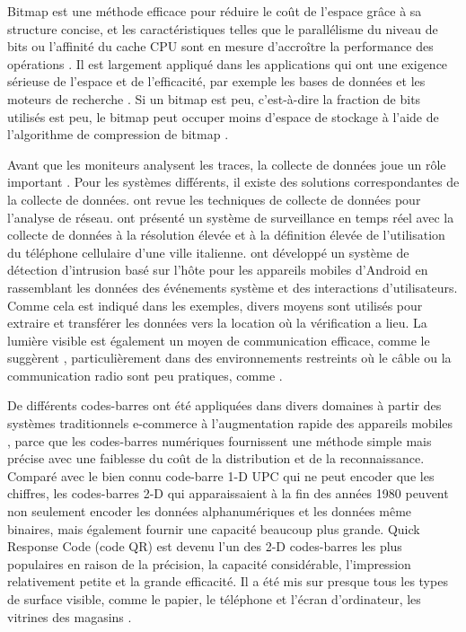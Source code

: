 Bitmap est une méthode efficace pour réduire le coût de l'espace grâce à sa structure concise, et les caractéristiques telles que le parallélisme du niveau de bits ou l'affinité du cache CPU sont en mesure d'accroître la performance des opérations \citep{culpepper2010efficient}. Il est largement appliqué dans les applications qui ont une exigence sérieuse de l'espace et de l'efficacité, par exemple les bases de données et les moteurs de recherche \citep{lemire2014}. Si un bitmap est peu, c'est-à-dire la fraction de bits utilisés est peu, le bitmap peut occuper moins d'espace de stockage à l'aide de l'algorithme de compression de bitmap \citep{antoshenkov1995byte}.

Avant que les moniteurs analysent les traces, la collecte de données joue un rôle important \citep{casley1988collection}. Pour les systèmes différents, il existe des solutions correspondantes de la collecte de données. \cite{zwijze2005auditing} ont revue les techniques de collecte de données pour l'analyse de réseau. \cite{calabrese2011real} ont présenté un système de surveillance en temps réel avec la collecte de données à la résolution élevée et à la définition élevée de l'utilisation du téléphone cellulaire d'une ville italienne. \cite{shabtai2010applying} ont développé un système de détection d'intrusion basé sur l'hôte pour les appareils mobiles d'Android en rassemblant les données des événements système et des interactions d'utilisateurs. Comme cela est indiqué dans les exemples, divers moyens sont utilisés pour extraire et transférer les données vers la location où la vérification a lieu. La lumière visible est également un moyen de communication efficace, comme le suggèrent \cite{komine2004fundamental}, particulièrement dans des environnements restreints où le câble ou la communication radio sont peu pratiques, comme \cite{vasilescu2005data}.

De différents codes-barres ont été appliquées dans divers domaines à partir des systèmes traditionnels e-commerce à l'augmentation rapide des appareils mobiles \citep{gao2007understanding}, parce que les codes-barres numériques fournissent une méthode simple mais précise avec une faiblesse du coût de la distribution et de la reconnaissance. Comparé avec le bien connu code-barre 1-D UPC qui ne peut encoder que les chiffres, les codes-barres 2-D qui apparaissaient à la fin des années 1980 peuvent non seulement encoder les données alphanumériques et les données même binaires, mais également fournir une capacité beaucoup plus grande. Quick Response Code (code QR) \citep{qrcode-about} est devenu l'un des 2-D codes-barres les plus populaires en raison de la précision, la capacité considérable, l'impression relativement petite et la grande efficacité. Il a été mis sur presque tous les types de surface visible, comme le papier, le téléphone et l'écran d'ordinateur, les vitrines des magasins \citep{okazaki2012benchmarking}.

